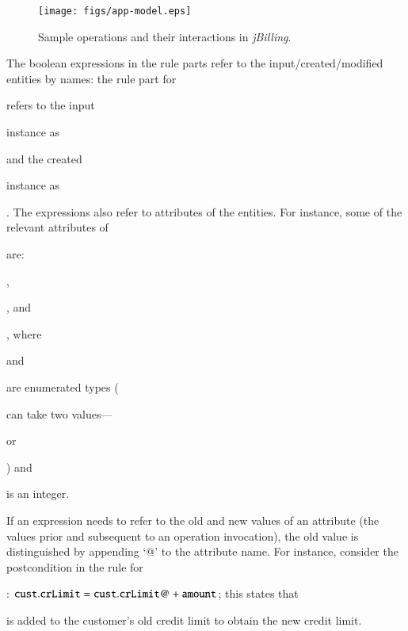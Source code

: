 \begin{figure}[t]
\centering
\texttt{[image: figs/app-model.eps]}
\vspace*{-12pt}
\caption{Sample operations and their interactions in \textit{jBilling}.}
\vspace*{-0pt}
\label{fig:sample-app}
\end{figure}

The boolean expressions in the rule parts refer to the input/crea\-ted/modified
entities by names: \eg the rule part for \subject{CreateOrder} refers to the
input \subject{Customer} instance as \subject{cust} and the created
\subject{Order} instance as \subject{ord}. The expressions also refer to
attributes of the entities. For instance, some of the relevant attributes of
\subject{Customer} are: \subject{State: state}, \subject{BalanceType: balType},
and \subject{int: crLimit}, 
where \subject{State} and \subject{BalanceType} are
enumerated types (\eg \subject{BalanceType} can take two values---\subject{None}
or \subject{Credit}) and \subject{crLimit} is an integer.

If an expression needs to refer to the old and new values of an attribute (the
values prior and subsequent to an operation invocation), the old value is
distinguished by appending `@' to the attribute name. For instance, consider the
postcondition in the rule for \subject{AddCreditLimit}: {\small ${\tt
    cust.crLimit} = {\tt cust.crLimit@} + {\tt amount}$}; this states that \subject{amount}
is added to the customer's old credit limit to obtain the
new credit limit.
